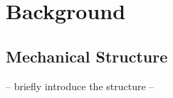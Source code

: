 \documentclass[letterpaper, 10 pt, conference]{ieeeconf}
\begin{document}
\section{Background}

\subsection{Mechanical Structure}
-- briefly introduce the structure --
\end{document}
